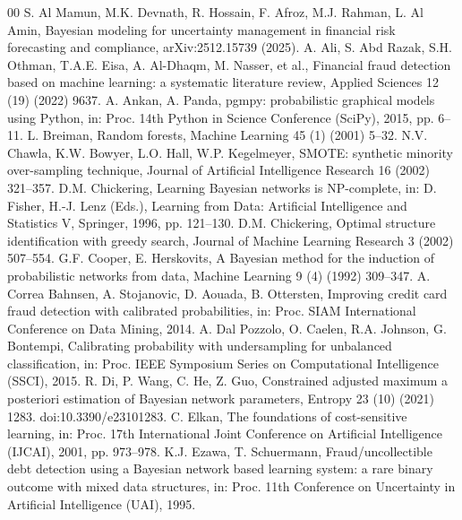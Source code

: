 \documentclass[final,5p,times,authoryear]{elsarticle}
\begin{document}
\begingroup\footnotesize
\begin{thebibliography}{00}
 S. Al Mamun, M.K. Devnath, R. Hossain, F. Afroz, M.J. Rahman, L. Al Amin, Bayesian modeling for uncertainty management in financial risk forecasting and compliance, arXiv:2512.15739 (2025).
 A. Ali, S. Abd Razak, S.H. Othman, T.A.E. Eisa, A. Al-Dhaqm, M. Nasser, et al., Financial fraud detection based on machine learning: a systematic literature review, Applied Sciences 12 (19) (2022) 9637.
 A. Ankan, A. Panda, pgmpy: probabilistic graphical models using Python, in: Proc. 14th Python in Science Conference (SciPy), 2015, pp. 6--11.
 L. Breiman, Random forests, Machine Learning 45 (1) (2001) 5--32.
 N.V. Chawla, K.W. Bowyer, L.O. Hall, W.P. Kegelmeyer, SMOTE: synthetic minority over-sampling technique, Journal of Artificial Intelligence Research 16 (2002) 321--357.
 D.M. Chickering, Learning Bayesian networks is NP-complete, in: D. Fisher, H.-J. Lenz (Eds.), Learning from Data: Artificial Intelligence and Statistics V, Springer, 1996, pp. 121--130.
 D.M. Chickering, Optimal structure identification with greedy search, Journal of Machine Learning Research 3 (2002) 507--554.
 G.F. Cooper, E. Herskovits, A Bayesian method for the induction of probabilistic networks from data, Machine Learning 9 (4) (1992) 309--347.
 A. Correa Bahnsen, A. Stojanovic, D. Aouada, B. Ottersten, Improving credit card fraud detection with calibrated probabilities, in: Proc. SIAM International Conference on Data Mining, 2014.
 A. Dal Pozzolo, O. Caelen, R.A. Johnson, G. Bontempi, Calibrating probability with undersampling for unbalanced classification, in: Proc. IEEE Symposium Series on Computational Intelligence (SSCI), 2015.
 R. Di, P. Wang, C. He, Z. Guo, Constrained adjusted maximum a posteriori estimation of Bayesian network parameters, Entropy 23 (10) (2021) 1283. doi:10.3390/e23101283.
 C. Elkan, The foundations of cost-sensitive learning, in: Proc. 17th International Joint Conference on Artificial Intelligence (IJCAI), 2001, pp. 973--978.
 K.J. Ezawa, T. Schuermann, Fraud/uncollectible debt detection using a Bayesian network based learning system: a rare binary outcome with mixed data structures, in: Proc. 11th Conference on Uncertainty in Artificial Intelligence (UAI), 1995.

\end{thebibliography}
\end{document}
